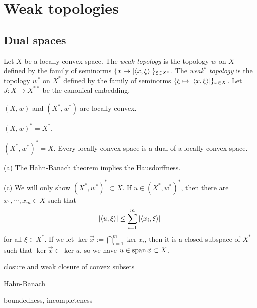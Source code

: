 \documentclass{../note}
\begin{document}
\chapter{Weak topologies}
\section{Dual spaces}

\begin{prb}[Bidual]
\end{prb}

\begin{prb}
Let $X$ be a locally convex space.
The \emph{weak topology} is the topology $w$ on $X$ defined by the family of seminorms $\{x\mapsto|\langle x,\xi\rangle|\}_{\xi\in X^*}$.
The \emph{weak$^*$ topology} is the topology $w^*$ on $X^*$ defined by the family of seminorms $\{\xi\mapsto|\langle x,\xi\rangle|\}_{x\in X}$.
Let $J:X\to X^{**}$ be the canonical embedding.
\begin{parts}
\item $(X,w)$ and $(X^*,w^*)$ are locally convex.
\item $(X,w)^*=X^*$.
\item $(X^*,w^*)^*=X$. Every locally convex space is a dual of a locally convex space.
\end{parts}
\end{prb}
\begin{pf}
(a)
The Hahn-Banach theorem implies the Hausdorffness.

(c)
We will only show $(X^*,w^*)^*\subset X$.
If $u\in(X^*,w^*)^*$, then there are $x_1,\cdots,x_m\in X$ such that
\[|\langle u,\xi\rangle|\le\sum_{i=1}^m|\langle x_i,\xi\rangle|\]
for all $\xi\in X^*$.
If we let $\ker\vec x:=\bigcap_{i=1}^m\ker x_i$, then it is a closed subspace of $X^*$ such that $\ker\vec x\subset\ker u$, so we have $u\in\operatorname{span}\vec x\subset X$.
\end{pf}

\begin{prb}
closure and weak closure of convex subsets
\end{prb}
\begin{pf}
Hahn-Banach
\end{pf}

\begin{prb}[Polar]
\end{prb}


boundedness, incompleteness
\end{document}
